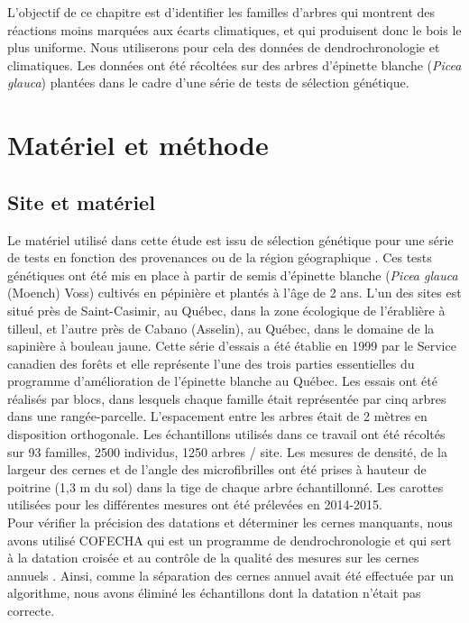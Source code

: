 \documentclass{report}
\begin{document}
L'objectif de ce chapitre est d'identifier les familles d'arbres qui montrent des réactions moins marquées aux écarts climatiques, et qui produisent donc le bois le plus uniforme. Nous utiliserons pour cela des données de dendrochronologie et climatiques. Les données ont été récoltées sur des arbres d'épinette blanche (\textit{Picea glauca}) plantées dans le cadre d'une série de tests de sélection génétique. 


\section{Matériel et méthode}

\subsection*{Site et matériel}\label{matériel}

Le matériel utilisé dans cette étude est issu de sélection génétique pour une série de tests en fonction des provenances ou de la région géographique \citep{Beaulieu1996}. Ces tests génétiques ont été mis en place à partir de semis d'épinette blanche (\textit{Picea glauca} (Moench) Voss) cultivés en pépinière et plantés à l'âge de 2 ans. L'un des sites est situé près de Saint-Casimir, au Québec, dans la zone écologique de l'érablière à tilleul, et l'autre près de Cabano (Asselin), au Québec, dans le domaine de la sapinière à bouleau jaune. Cette série d'essais a été établie en 1999 par le Service canadien des forêts et elle représente l'une des trois parties essentielles du programme d'amélioration de l'épinette blanche au Québec. Les essais ont été réalisés par blocs, dans lesquels chaque famille était représentée par cinq arbres dans une rangée-parcelle. L'espacement entre les arbres était de 2 mètres en disposition orthogonale. Les échantillons utilisés dans ce travail ont été récoltés sur 93 familles, 2500 individus, 1250 arbres / site. Les mesures de densité, de la largeur des cernes et de l'angle des microfibrilles ont été prises à hauteur de poitrine (1,3 m du sol) dans la tige de chaque arbre échantillonné. Les carottes utilisées pour les différentes mesures ont été prélevées en 2014-2015.  \\ 

Pour vérifier la précision des datations et déterminer les cernes manquants, nous avons utilisé COFECHA qui est un programme de dendrochronologie et qui sert à la datation croisée et au contrôle de la qualité des mesures sur les cernes annuels \citep{HOLMES1983}. Ainsi, comme la séparation des cernes annuel avait été effectuée par un algorithme, nous avons éliminé les échantillons dont la datation n'était pas correcte. %
\end{document}

